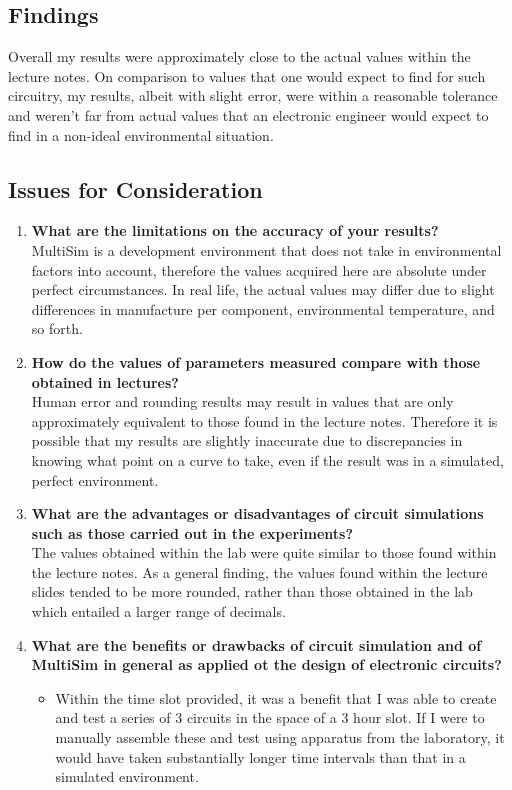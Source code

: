\documentclass[12pt]{article}
\begin{document}
\subsection{Findings}
Overall my results were approximately close to the actual values within the lecture notes. On comparison to values that one would expect to find for such circuitry, my results, albeit with slight error, were within a reasonable tolerance and weren't far from actual values that an electronic engineer would expect to find in a non-ideal environmental situation.
\subsection{Issues for Consideration}
\begin{enumerate}
  \item \textbf{What are the limitations on the accuracy of your results?} \hfill \\
  MultiSim is a development environment that does not take in environmental factors into account, therefore the values acquired here are absolute under perfect circumstances. In real life, the actual values may differ due to slight differences in manufacture per component, environmental temperature, and so forth.
  \item \textbf{How do the values of parameters measured compare with those obtained in lectures?} \hfill \\
  Human error and rounding results may result in values that are only approximately equivalent to those found in the lecture notes. Therefore it is possible that my results are slightly inaccurate due to discrepancies in knowing what point on a curve to take, even if the result was in a simulated, perfect environment.
  \item \textbf{What are the advantages or disadvantages of circuit simulations such as those carried out in the experiments?} \hfill \\
  The values obtained within the lab were quite similar to those found within the lecture notes. As a general finding, the values found within the lecture slides tended to be more rounded, rather than those obtained in the lab which entailed a larger range of decimals.
  \item \textbf{What are the benefits or drawbacks of circuit simulation and of MultiSim in general as applied ot the design of electronic circuits?} \hfill
  \begin{itemize}
  \item Within the time slot provided, it was a benefit that I was able to create and test a series of 3 circuits in the space of a 3 hour slot. If I were to manually assemble these and test using apparatus from the laboratory, it would have taken substantially longer time intervals than that in a simulated environment.

\end{itemize}
\end{enumerate}
\end{document}
